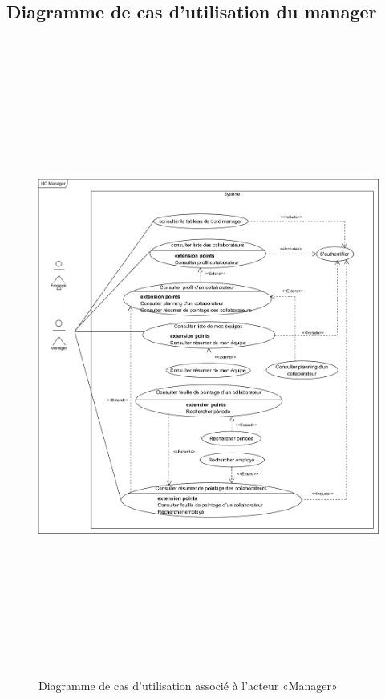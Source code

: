 \subsection{Diagramme de cas d'utilisation du manager}
    \begin{figure}[h!]
        \centering
        \includegraphics[width=16cm,height=21cm]{images/uc_manager.png}
        \caption{Diagramme de cas d'utilisation associé à l'acteur «Manager»}
        \label{fig3}
    \end{figure}

\clearpage  
 
